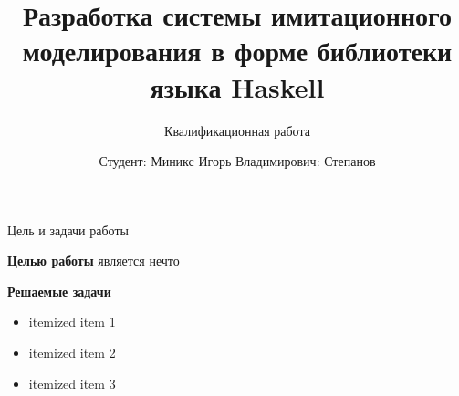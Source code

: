 \documentclass[utf8x]{beamer}
\title{Разработка системы имитационного моделирования в форме библиотеки языка Haskell}
\subtitle{Квалификационная работа}
\author{Студент: Миникс Игорь Владимирович\newlineРуководитель: Степанов}
\begin{document}
\begin{frame}[plain]
  \titlepage
\end{frame}

\begin{frame}{Цель и задачи работы}

\textbf{Целью работы} является нечто

\hfill

\textbf{Решаемые задачи}

\begin{itemize}
  \item itemized item 1
  \item itemized item 2
  \item itemized item 3
\end{itemize}


\end{frame}
\end{document}
